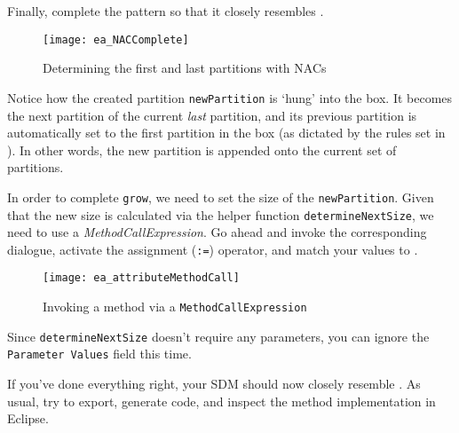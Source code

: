 \begin{stepbystep}
\item Finally, complete the pattern so that it closely resembles . 

\begin{figure}[htbp]
\begin{center}
  \texttt{[image: ea\_NACComplete]} 
  \caption{Determining the first and last partitions with NACs}  
  \label{ea:sdm_firstLastPartitions}
\end{center}
\end{figure}
 
\item Notice how the created partition \texttt{newPartition} is `hung' into the box. It becomes the next partition of the current
\emph{last} partition, and its previous partition is automatically set to the first partition in the box (as dictated by the rules set in
). In other words, the new partition is appended onto the current set of partitions.

\item In order to complete \texttt{grow}, we need to set the size of the \texttt{newPartition}. Given that the new size is calculated
via the helper function \texttt{det\-er\-mine\-Next\-Size}, we need to use a \emph{MethodCallExpression}. Go ahead and invoke the corresponding dialogue,
activate the assignment (\texttt{:=}) operator, and match your values to .
 
\begin{figure}[htbp]
\begin{center}
  \texttt{[image: ea\_attributeMethodCall]}
  \caption{Invoking a method via a \texttt{MethodCallExpression}}  
  \label{ea:sdm_methodCallExpr} 
\end{center}
\end{figure}

\item Since \texttt{determineNextSize} doesn't require any parameters, you can ignore the \texttt{Parameter Values} field this time. 

\vspace{0.5cm}

\item If you've done everything right, your SDM should now closely resemble . As usual, try to export,
generate code, and inspect the method implementation in Eclipse.

\vspace{0.5cm}


\end{stepbystep}
